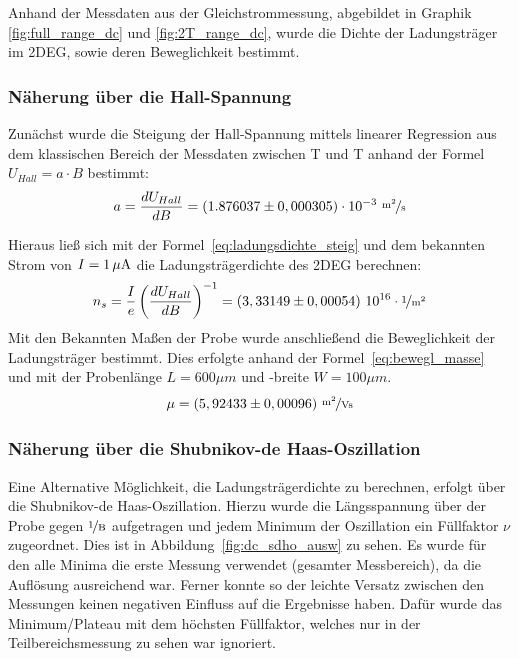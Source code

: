 

Anhand der Messdaten aus der Gleichstrommessung, abgebildet in Graphik \ref{fig:full_range_dc} und \ref{fig:2T_range_dc}, wurde die Dichte der Ladungsträger im 2DEG, sowie deren Beweglichkeit bestimmt.

\subsubsection{Näherung über die Hall-Spannung}
\label{ch:naeherung_hall}

Zunächst wurde die Steigung der Hall-Spannung mittels linearer Regression aus dem klassischen Bereich der Messdaten zwischen \unit[-2]{T} und \unit[2]{T} anhand der Formel $ U_{Hall}=a\cdot B $  
bestimmt:
\begin{equation}
	a=\d{U_{Hall}}{B} = (1.876037 \pm 0,000305)\cdot10^{-3} ~  \unitfrac{m^2}{s}
\end{equation} %

Hieraus ließ sich mit der Formel~\eqref{eq:ladungsdichte_steig} und dem bekannten Strom von $I=\unit[1]{\mu A}$ die Ladungsträgerdichte des 2DEG berechnen: 
\begin{equation}
	n_s= \frac{I}{e}\left({\d{U_{Hall}}{B}}\right)^{-1}=(3,33149 \pm 0,00054) ~ 10^{16}\cdot \unitfrac{1}{m^2}
\end{equation} %
Mit den Bekannten Maßen der Probe wurde anschließend die Beweglichkeit der Ladungsträger bestimmt. Dies erfolgte anhand der Formel~\ref{eq:bewegl_masse} und mit der Probenlänge $L=600\mu m$ und -breite $W=100\mu m$.\\
\begin{equation}
\mu= (5,92433\pm 0,00096) ~ \unitfrac{m^2}{Vs} %
\end{equation}


 
\subsubsection{Näherung über die Shubnikov-de Haas-Oszillation}
\label{ch:naeherung_sdho}

Eine Alternative Möglichkeit, die Ladungsträgerdichte zu berechnen, erfolgt über die Shubnikov-de Haas-Oszillation. Hierzu wurde die Längsspannung über der Probe 
 gegen $\unitfrac{1}{B}$ aufgetragen und jedem Minimum der Oszillation ein Füllfaktor $\nu$ zugeordnet. Dies ist in Abbildung~\ref{fig:dc_sdho_ausw} zu sehen. Es wurde für den alle Minima die erste Messung verwendet (gesamter Messbereich), da die Auflösung ausreichend war. Ferner konnte so der leichte Versatz zwischen den Messungen keinen negativen Einfluss auf die Ergebnisse haben. Dafür wurde das Minimum/Plateau mit dem höchsten Füllfaktor, welches nur in der Teilbereichsmessung zu sehen war ignoriert.
 
